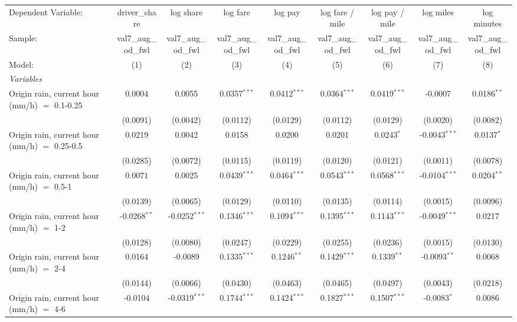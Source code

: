\ifdefined\ifclassloaded
{}
\fi
\begingroup
\centering
\begin{tabular}{lcccccccc}
   \tabularnewline \midrule \midrule
   Dependent Variable: & driver\_share & log share & log fare & log pay & log fare / mile & log pay / mile & log miles & log minutes\\
   Sample: & val7\_aug\_od\_fwl & val7\_aug\_od\_fwl & val7\_aug\_od\_fwl & val7\_aug\_od\_fwl & val7\_aug\_od\_fwl & val7\_aug\_od\_fwl & val7\_aug\_od\_fwl & val7\_aug\_od\_fwl \\
   Model: & (1) & (2) & (3) & (4) & (5) & (6) & (7) & (8)\\
   \midrule
   \emph{Variables}\\
   Origin rain, current hour (mm/h) $=$ 0.1-0.25 & 0.0004 & 0.0055 & 0.0357$^{***}$ & 0.0412$^{***}$ & 0.0364$^{***}$ & 0.0419$^{***}$ & -0.0007 & 0.0186$^{**}$\\
    & (0.0091) & (0.0042) & (0.0112) & (0.0129) & (0.0112) & (0.0129) & (0.0020) & (0.0082)\\
   Origin rain, current hour (mm/h) $=$ 0.25-0.5 & 0.0219 & 0.0042 & 0.0158 & 0.0200 & 0.0201 & 0.0243$^{*}$ & -0.0043$^{***}$ & 0.0137$^{*}$\\
    & (0.0285) & (0.0072) & (0.0115) & (0.0119) & (0.0120) & (0.0121) & (0.0011) & (0.0078)\\
   Origin rain, current hour (mm/h) $=$ 0.5-1 & 0.0071 & 0.0025 & 0.0439$^{***}$ & 0.0464$^{***}$ & 0.0543$^{***}$ & 0.0568$^{***}$ & -0.0104$^{***}$ & 0.0204$^{**}$\\
    & (0.0139) & (0.0065) & (0.0129) & (0.0110) & (0.0135) & (0.0114) & (0.0015) & (0.0096)\\
   Origin rain, current hour (mm/h) $=$ 1-2 & -0.0268$^{**}$ & -0.0252$^{***}$ & 0.1346$^{***}$ & 0.1094$^{***}$ & 0.1395$^{***}$ & 0.1143$^{***}$ & -0.0049$^{***}$ & 0.0217\\
    & (0.0128) & (0.0080) & (0.0247) & (0.0229) & (0.0255) & (0.0236) & (0.0015) & (0.0130)\\
   Origin rain, current hour (mm/h) $=$ 2-4 & 0.0164 & -0.0089 & 0.1335$^{***}$ & 0.1246$^{**}$ & 0.1429$^{***}$ & 0.1339$^{**}$ & -0.0093$^{**}$ & 0.0068\\
    & (0.0144) & (0.0066) & (0.0430) & (0.0463) & (0.0465) & (0.0497) & (0.0043) & (0.0218)\\
   Origin rain, current hour (mm/h) $=$ 4-6 & -0.0104 & -0.0319$^{***}$ & 0.1744$^{***}$ & 0.1424$^{***}$ & 0.1827$^{***}$ & 0.1507$^{***}$ & -0.0083$^{*}$ & 0.0086\\

\end{tabular}
